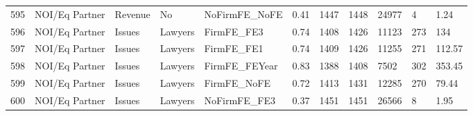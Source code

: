 \documentclass{article}
\begin{document}
\begin{table}[H]
\begin{tabular}{rllllllllll}
  595 & NOI/Eq Partner & Revenue & No & NoFirmFE\_NoFE & 0.41 & 1447 & 1448 & 24977 & 4 & 1.24 \\ 
  596 & NOI/Eq Partner & Issues & Lawyers & FirmFE\_FE3 & 0.74 & 1408 & 1426 & 11123 & 273 & 134 \\ 
  597 & NOI/Eq Partner & Issues & Lawyers & FirmFE\_FE1 & 0.74 & 1409 & 1426 & 11255 & 271 & 112.57 \\ 
  598 & NOI/Eq Partner & Issues & Lawyers & FirmFE\_FEYear & 0.83 & 1388 & 1408 & 7502 & 302 & 353.45 \\ 
  599 & NOI/Eq Partner & Issues & Lawyers & FirmFE\_NoFE & 0.72 & 1413 & 1431 & 12285 & 270 & 79.44 \\ 
  600 & NOI/Eq Partner & Issues & Lawyers & NoFirmFE\_FE3 & 0.37 & 1451 & 1451 & 26566 & 8 & 1.95 \\ 
   \hline
\end{tabular}
\end{table}
\end{document}
